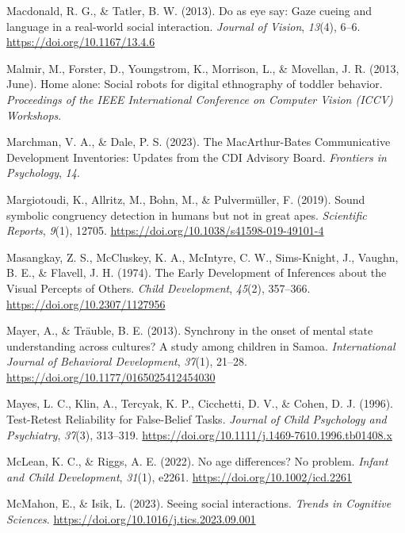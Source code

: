 \documentclass[
]{scrbook}
\newlength{\cslhangindent}
\newenvironment{CSLReferences}[2] %
 {\begin{list}{}{%
  \setlength{\itemindent}{0pt}
  \setlength{\leftmargin}{0pt}
  \setlength{\parsep}{0pt}
  \ifodd #1
   \setlength{\leftmargin}{\cslhangindent}
   \setlength{\itemindent}{-1\cslhangindent}
  \fi
  \setlength{\itemsep}{#2\baselineskip}}}
 {\end{list}}
\begin{document}
\begin{CSLReferences}{1}{0}
Macdonald, R. G., \& Tatler, B. W. (2013). Do as eye say: {Gaze} cueing and language in a real-world social interaction. \emph{Journal of Vision}, \emph{13}(4), 6--6. \url{https://doi.org/10.1167/13.4.6}

Malmir, M., Forster, D., Youngstrom, K., Morrison, L., \& Movellan, J. R. (2013, June). Home alone: {Social} robots for digital ethnography of toddler behavior. \emph{Proceedings of the {IEEE} International Conference on Computer Vision ({ICCV}) Workshops}.

Marchman, V. A., \& Dale, P. S. (2023). The {MacArthur-Bates Communicative Development Inventories}: Updates from the {CDI Advisory Board}. \emph{Frontiers in Psychology}, \emph{14}.

Margiotoudi, K., Allritz, M., Bohn, M., \& Pulvermüller, F. (2019). Sound symbolic congruency detection in humans but not in great apes. \emph{Scientific Reports}, \emph{9}(1), 12705. \url{https://doi.org/10.1038/s41598-019-49101-4}

Masangkay, Z. S., McCluskey, K. A., McIntyre, C. W., Sims-Knight, J., Vaughn, B. E., \& Flavell, J. H. (1974). The {Early Development} of {Inferences} about the {Visual Percepts} of {Others}. \emph{Child Development}, \emph{45}(2), 357--366. \url{https://doi.org/10.2307/1127956}

Mayer, A., \& Träuble, B. E. (2013). Synchrony in the onset of mental state understanding across cultures? {A} study among children in {Samoa}. \emph{International Journal of Behavioral Development}, \emph{37}(1), 21--28. \url{https://doi.org/10.1177/0165025412454030}

Mayes, L. C., Klin, A., Tercyak, K. P., Cicchetti, D. V., \& Cohen, D. J. (1996). Test-{Retest Reliability} for {False-Belief Tasks}. \emph{Journal of Child Psychology and Psychiatry}, \emph{37}(3), 313--319. \url{https://doi.org/10.1111/j.1469-7610.1996.tb01408.x}

McLean, K. C., \& Riggs, A. E. (2022). No age differences? {No} problem. \emph{Infant and Child Development}, \emph{31}(1), e2261. \url{https://doi.org/10.1002/icd.2261}

McMahon, E., \& Isik, L. (2023). Seeing social interactions. \emph{Trends in Cognitive Sciences}. \url{https://doi.org/10.1016/j.tics.2023.09.001}


\end{CSLReferences}
\end{document}
